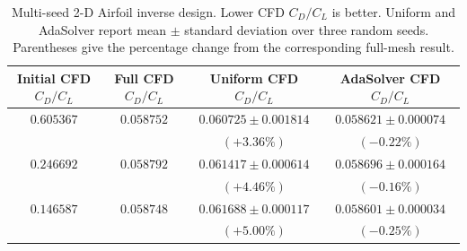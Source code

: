 \begin{table}[!htbp]
    \centering
    \small
    \caption{Multi-seed 2-D Airfoil inverse design. Lower CFD $C_D/C_L$ is better.
    Uniform and AdaSolver report mean $\pm$ standard deviation over three random
    seeds. Parentheses give the percentage change from the corresponding
    full-mesh result.}
    \label{tab:airfoil_inverse_design_multiseed}
    \setlength{\tabcolsep}{3pt}
    \renewcommand{\arraystretch}{1.15}
    \begin{tabular*}{\textwidth}{@{\extracolsep{\fill}}cccc@{}}
        \toprule
        \shortstack{Initial CFD\\$C_D/C_L$}
        & \shortstack{Full CFD\\$C_D/C_L$}
        & \shortstack{Uniform CFD\\$C_D/C_L$}
        & \shortstack{AdaSolver CFD\\$C_D/C_L$} \\
        \midrule
        $0.605367$ & $0.058752$
        & $0.060725\pm0.001814$ & $0.058621\pm0.000074$ \\[1pt]
        & & $(+3.36\%)$ & $(-0.22\%)$ \\
        \addlinespace[4pt]
        $0.246692$ & $0.058792$
        & $0.061417\pm0.000614$ & $0.058696\pm0.000164$ \\[1pt]
        & & $(+4.46\%)$ & $(-0.16\%)$ \\
        \addlinespace[4pt]
        $0.146587$ & $0.058748$
        & $0.061688\pm0.000117$ & $0.058601\pm0.000034$ \\[1pt]
        & & $(+5.00\%)$ & $(-0.25\%)$ \\
        \bottomrule
    \end{tabular*}
\end{table}
